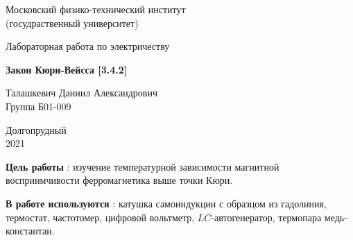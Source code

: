 \documentclass[a4paper, 12pt]{article}%
\begin{document}


\begin{titlepage}

	\newpage
	\begin{center}
		\normalsize Московский физико-технический институт \\(госудраственный 			университет)
	\end{center}

	\vspace{6em}

	\begin{center}
		\Large Лабораторная работа по электричеству\\
	\end{center}

	\vspace{1em}

	\begin{center}
		\large \textbf{Закон Кюри-Вейсса [3.4.2]}
	\end{center}

	\vspace{2em}

	\begin{center}
		\large Талашкевич Даниил Александрович\\
		Группа Б01-009
	\end{center}

	\vspace{\fill}

	\begin{center}
	Долгопрудный \\2021
	\end{center}
	
\end{titlepage}



	\thispagestyle{empty}
	\newpage
	\tableofcontents
	\newpage
	\setcounter{page}{1}


					
\textbf{Цель работы} : изучение температурной зависимости магнитной восприимчивости ферромагнетика выше точки Кюри.

\textbf{В работе используются} : катушка самоиндукции с образцом из гадолиния, термостат, частотомер, цифровой вольтметр, $L C$-автогенератор, термопара медь-константан.
                    
\end{document}
